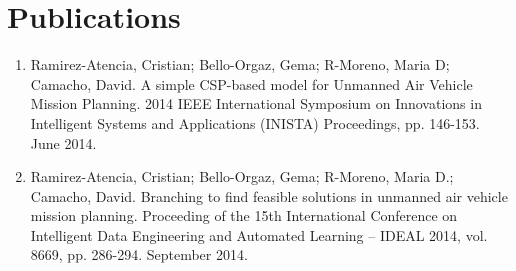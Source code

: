 
\chapter{Publications}
\label{AppendixB}

\begin{enumerate}

\item Ramirez-Atencia, Cristian; Bello-Orgaz, Gema; R-Moreno, Maria D; Camacho, David. A simple CSP-based model for Unmanned Air Vehicle Mission Planning. 2014 IEEE International Symposium on Innovations in Intelligent Systems and Applications (INISTA) Proceedings, pp. 146-153. June 2014.

\item Ramirez-Atencia, Cristian; Bello-Orgaz, Gema; R-Moreno, Maria D.; Camacho, David. Branching to find feasible solutions in unmanned air vehicle mission planning. Proceeding of the 15th International Conference on Intelligent Data Engineering and Automated Learning – IDEAL 2014, vol. 8669, pp. 286-294. September 2014.

\end{enumerate}